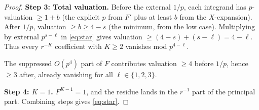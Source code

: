 \documentclass[10pt,a4paper]{amsart}
\begin{document}
\begin{proof}
\medskip\noindent\textbf{Step 3: Total valuation.}\quad
Before the external $1/p$, each integrand has $p$-valuation $\ge 1+b$ (the explicit $p$ from $F'$ plus at least $b$ from the $X$-expansion). After $1/p$, valuation $\ge b\ge 4-s$ (the minimum, from the low case). Multiplying by external $p^{s-\ell}$ in \eqref{eq:star} gives valuation $\ge (4-s)+(s-\ell)=4-\ell$. Thus every $r^{-K}$ coefficient with $K\ge 2$ vanishes mod $p^{4-\ell}$.

The suppressed $O(p^4)$ part of $F$ contributes valuation $\ge 4$ before $1/p$, hence $\ge 3$ after, already vanishing for all $\ell\in\{1,2,3\}$.

\medskip\noindent\textbf{Step 4: $K=1$.}\quad
$F^{K-1}=1$, and the residue lands in the $r^{-1}$ part of the principal part. Combining steps gives \eqref{eq:star}.
\end{proof}
\end{document}
